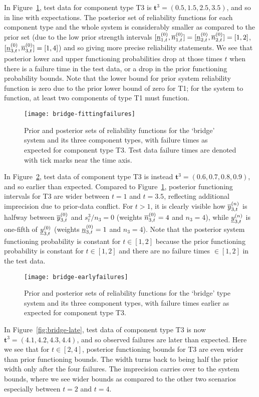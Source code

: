 \documentclass[12pt, a4paper]{elsarticle}
\newcommand{\bs}[1]{\boldsymbol{#1}}
\renewcommand{\vec}[1]{{\bs#1}}
\begin{document}
In Figure~\ref{fig:bridge-fitting}, 
test data for component type T3 is $\vec{t}^3 = (0.5, 1.5, 2.5, 3.5)$,
and so in line with expectations.
The posterior set of reliability functions for each component type and the whole system
is considerably smaller as compared to the prior set
(due to the low prior strength intervals
$[\underline{n}^{(0)}_{1,t},\overline{n}^{(0)}_{1,t}] = [\underline{n}^{(0)}_{2,t},\overline{n}^{(0)}_{2,t}] = [1,2]$, $[\underline{n}^{(0)}_{3,t},\overline{n}^{(0)}_{3,t}] = [1,4]$)
and so giving more precise reliability statements.
We see that posterior lower and upper functioning probabilities drop at those times $t$
when there is a failure time in the test data,
or a drop in the prior functioning probability bounds.
Note that the lower bound for prior system reliability function is zero
due to the prior lower bound of zero for T1;
for the system to function, at least two components of type T1 must function.

\begin{figure}
\texttt{[image: bridge-fittingfailures]}
\caption{Prior and posterior sets of reliability functions for the `bridge' system and its three component types,
with failure times as expected for component type T3.
Test data failure times are denoted with tick marks near the time axis.}
\label{fig:bridge-fitting}
\end{figure}

In Figure~\ref{fig:bridge-early},
test data of component type T3 is instead $\vec{t}^3 = (0.6, 0.7, 0.8, 0.9)$,
and so earlier than expected.
Compared to Figure~\ref{fig:bridge-fitting},
posterior functioning intervals for T3 are wider between $t=1$ and $t=3.5$,
reflecting additional imprecision due to prior-data conflict.
For $t > 1$, it is clearly visible how $\overline{y}^{(n)}_{3,t}$ is halfway between $\overline{y}^{(0)}_{3,t}$ and $s_t^3/n_3 = 0$
(weights $\overline{n}^{(0)}_{3,t} = 4$ and $n_3 = 4$),
while $\underline{y}^{(n)}_{3,t}$ is one-fifth of $\underline{y}^{(0)}_{3,t}$
(weights $\underline{n}^{(0)}_{3,t} = 1$ and $n_3 = 4$).
Note that the posterior system functioning probability is constant for $t \in [1,2]$
because the prior functioning probability is constant for $t \in [1,2]$
and there are no failure times $\in [1,2]$ in the test data.

\begin{figure}
\texttt{[image: bridge-earlyfailures]}
\caption{Prior and posterior sets of reliability functions for the `bridge' type system and its three component types,
with failure times earlier as expected for component type T3.}
\label{fig:bridge-early}
\end{figure}

In Figure~\ref{fig:bridge-late}, 
test data of component type T3 is now $\vec{t}^3 = (4.1, 4.2, 4.3, 4.4)$,
and so observed failures are later than expected.
Here we see that for $t \in [2,4]$,
posterior functioning bounds for T3 are even wider than prior functioning bounds.
The width turns back to being half the prior width
only after the four failures.
The imprecision carries over to the system bounds,
where we see wider bounds as compared to the other two scenarios
especially between $t=2$ and $t=4$.
\end{document}
